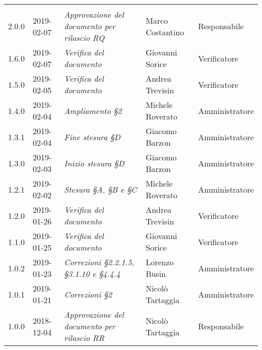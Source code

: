 \newpage 
\section*{}
	\begin{longtable}{C{2cm}|C{2.5cm}|C{4.5cm}|C{2.5cm}|C{3cm}}

		 &  &  &  &   \\
		\endhead
		
		2.0.0 & 2019-02-07 & \emph{Approvazione del documento per rilascio RQ} & Marco Costantino & Responsabile \\
		\hline
		
		1.6.0 & 2019-02-07 & \emph{Verifica del documento}  & Giovanni Sorice & Verificatore  \\
		\hline
		
		1.5.0 & 2019-02-05 & \emph{Verifica del documento} & Andrea Trevisin & Verificatore  \\
		\hline
		
		1.4.0 & 2019-02-04 & \emph{Ampliamento §2} & Michele Roverato & Amministratore  \\
		\hline
		
		 1.3.1 & 2019-02-04 & \emph{Fine stesura §D} & Giacomo Barzon & Amministratore \\
		\hline
		
		1.3.0 & 2019-02-03 & \emph{Inizio stesura §D} & Giacomo Barzon & Amministratore  \\
		\hline
		
		1.2.1 & 2019-02-02 & \emph{Stesura §A, §B e §C} & Michele Roverato & Amministratore  \\
		\hline
		
		1.2.0 & 2019-01-26 & \emph{Verifica del documento} & Andrea Trevisin & Verificatore  \\
		\hline
		
		1.1.0 & 2019-01-25 & \emph{Verifica del documento} & Giovanni Sorice & Verificatore  \\
		\hline
		
		1.0.2 & 2019-01-23 & \emph{Correzioni §2.2.1.5, §3.1.10 e §4.4.4} & Lorenzo Busin & Amministratore \\
		\hline
		
		1.0.1 & 2019-01-21 & \emph{Correzioni §2} & Nicolò Tartaggia & Amministratore  \\
		\hline
		
		1.0.0  & 2018-12-04 & \emph{Approvazione del documento per rilascio RR} & Nicolò Tartaggia & Responsabile \\
		\hline
		

\end{longtable}
